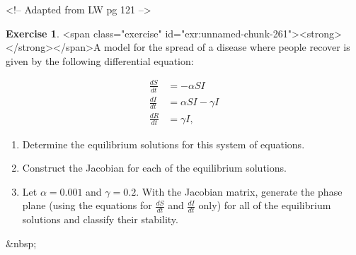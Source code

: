 \documentclass[
]{book}
\theoremstyle{definition}
\theoremstyle{definition}
\theoremstyle{definition}
\newtheorem{exercise}{Exercise}[chapter]
\theoremstyle{remark}
\begin{document}
<!-- Adapted from LW pg 121 -->
\begin{exercise}
<span class="exercise" id="exr:unnamed-chunk-261"><strong>\label{exr:unnamed-chunk-261} </strong></span>A model for the spread of a disease where people recover is given by the following differential equation:

\begin{equation}
\begin{split}
\frac{dS}{dt} &= -\alpha SI \\
\frac{dI}{dt} &= \alpha SI - \gamma I \\
\frac{dR}{dt} &= \gamma I,
\end{split}
\end{equation}

\begin{enumerate}[label=\alph*.]
\item Determine the equilibrium solutions for this system of equations.
\item Construct the Jacobian for each of the equilibrium solutions.
\item Let $\alpha=0.001$ and $\gamma = 0.2$. With the Jacobian matrix, generate the phase plane (using the equations for $\displaystyle \frac{dS}{dt}$ and $\displaystyle \frac{dI}{dt}$ only) for all of the equilibrium solutions and classify their stability.
\end{enumerate}
\end{exercise}

&nbsp;
\end{document}
